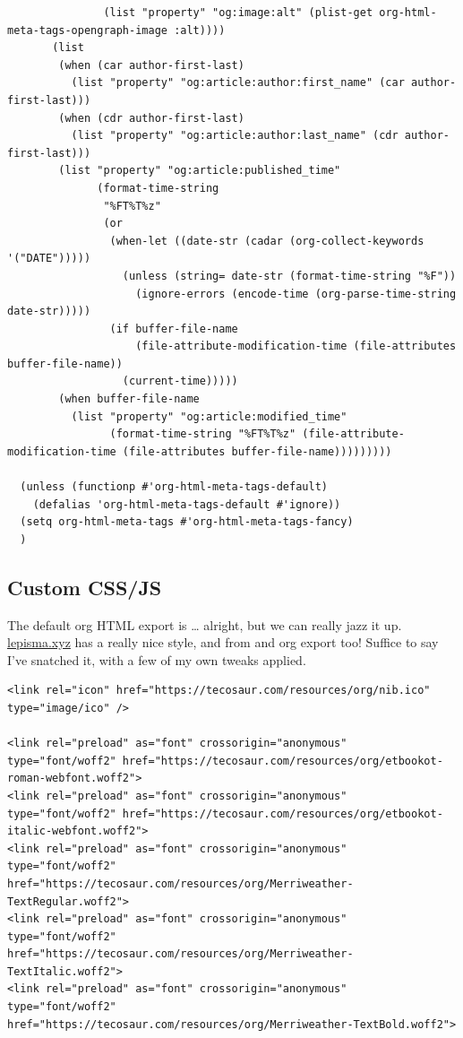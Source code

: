 \documentclass[11pt]{article}
\begin{document}
\begin{verbatim}
               (list "property" "og:image:alt" (plist-get org-html-meta-tags-opengraph-image :alt))))
       (list
        (when (car author-first-last)
          (list "property" "og:article:author:first_name" (car author-first-last)))
        (when (cdr author-first-last)
          (list "property" "og:article:author:last_name" (cdr author-first-last)))
        (list "property" "og:article:published_time"
              (format-time-string
               "%FT%T%z"
               (or
                (when-let ((date-str (cadar (org-collect-keywords '("DATE")))))
                  (unless (string= date-str (format-time-string "%F"))
                    (ignore-errors (encode-time (org-parse-time-string date-str)))))
                (if buffer-file-name
                    (file-attribute-modification-time (file-attributes buffer-file-name))
                  (current-time)))))
        (when buffer-file-name
          (list "property" "og:article:modified_time"
                (format-time-string "%FT%T%z" (file-attribute-modification-time (file-attributes buffer-file-name)))))))))

  (unless (functionp #'org-html-meta-tags-default)
    (defalias 'org-html-meta-tags-default #'ignore))
  (setq org-html-meta-tags #'org-html-meta-tags-fancy)
  )
\end{verbatim}
\subsection{Custom CSS/JS}
\label{sec:orgcf9754f}

The default org HTML export is \ldots{} alright, but we can really jazz it up.
\href{https://lepisma.xyz}{lepisma.xyz} has a really nice style, and from and org export too!
Suffice to say I've snatched it, with a few of my own tweaks applied.

\begin{verbatim}
<link rel="icon" href="https://tecosaur.com/resources/org/nib.ico" type="image/ico" />

<link rel="preload" as="font" crossorigin="anonymous" type="font/woff2" href="https://tecosaur.com/resources/org/etbookot-roman-webfont.woff2">
<link rel="preload" as="font" crossorigin="anonymous" type="font/woff2" href="https://tecosaur.com/resources/org/etbookot-italic-webfont.woff2">
<link rel="preload" as="font" crossorigin="anonymous" type="font/woff2" href="https://tecosaur.com/resources/org/Merriweather-TextRegular.woff2">
<link rel="preload" as="font" crossorigin="anonymous" type="font/woff2" href="https://tecosaur.com/resources/org/Merriweather-TextItalic.woff2">
<link rel="preload" as="font" crossorigin="anonymous" type="font/woff2" href="https://tecosaur.com/resources/org/Merriweather-TextBold.woff2">
\end{verbatim}
\end{document}
